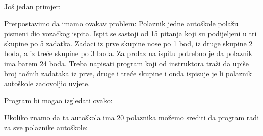 Jo\v{s} jedan primjer:

Pretpostavimo da imamo ovakav problem:
Polaznik jedne auto\v{s}kole pola\v{z}u pismeni dio voza\v{c}kog ispita.
Ispit se sastoji od 15 pitanja koji su podijeljeni u tri skupine po 5 zadatka.
Zadaci iz prve skupine nose po 1 bod, iz druge skupine 2 boda, a iz tre\'{c}e
skupine po 3 boda. Za prolaz na ispitu potrebno je da polaznik ima barem 24 boda.
Treba napisati program koji od instruktora tra\v{z}i da upi\v{s}e broj to\v{c}nih
zadataka iz prve, druge i tre\'{c}e skupine i onda ispisuje je li polaznik
auto\v{s}kole zadovoljio uvjete.

Program bi mogao izgledati ovako:


Ukoliko znamo da ta auto\v{s}kola ima 20 polaznika mo\v{z}emo srediti da program
radi za sve polaznike auto\v{s}kole:


